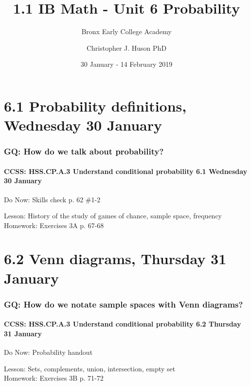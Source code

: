 \documentclass{beamer}
\title{1.1 IB Math - Unit 6 Probability}
\subtitle{Bronx Early College Academy}
\author{Christopher J. Huson PhD}
\date{30 January - 14 February 2019}
\begin{document}
\frame{\titlepage}

\section[Outline]{}
\frame{\tableofcontents}

\section{6.1 Probability definitions, Wednesday 30 January}
  \frame
  {
    \frametitle{GQ: How do we talk about probability?}
    \framesubtitle{CCSS: HSS.CP.A.3 Understand conditional probability \hfill \alert{6.1 Wednesday 30 January}}

    \begin{block}{Do Now: Skills check p. 62 \#1-2}
    \end{block}
    Lesson: History of the study of games of chance, sample space, frequency \\ \bigskip
    Homework: Exercises 3A p. 67-68
  }


\section{6.2 Venn diagrams, Thursday 31 January}
  \frame
  {
    \frametitle{GQ: How do we notate sample spaces with Venn diagrams?}
    \framesubtitle{CCSS: HSS.CP.A.3 Understand conditional probability \hfill  \alert{6.2 Thursday 31 January}}

    \begin{block}{Do Now: Probability handout}
    \end{block}
    Lesson: Sets, complements, union, intersection, empty set \\ \bigskip
    Homework: Exercises 3B p. 71-72
  }
\end{document}
